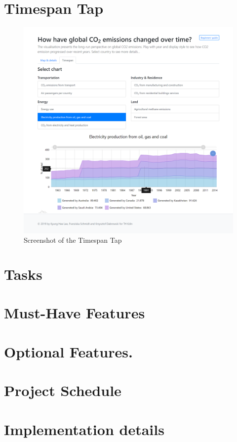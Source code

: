 \documentclass[a4paper]{article}
\begin{document}
\section{Timespan Tap}
\begin{figure}[h!]
\includegraphics[width=1.0\textwidth]{screencapture-glanonim-Archive-visualization-2020-01-12-17_49_13.png} 
\caption{Screenshot of the Timespan Tap}
\end{figure}

\section{Tasks}
\section{Must-Have Features}
\section{Optional Features.}
\section{Project Schedule}
\section{Implementation details}
\end{document}
